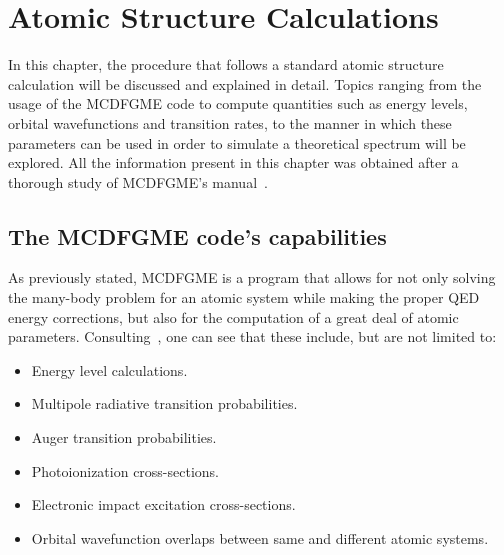
%


\chapter{Atomic Structure Calculations}\label{cha:atom_calc}

In this chapter, the procedure that follows a standard atomic structure calculation will be discussed and explained in detail. Topics ranging from the usage of the \gls{MCDFGME} code to compute  quantities such as energy levels, orbital wavefunctions and transition rates, to the manner in which these parameters can be used in order to simulate a theoretical spectrum will be explored. All the information present in this chapter was obtained after a thorough study of \gls{MCDFGME}'s manual~\cite{Desclaux_Indelicato_2019}.


\section{The \gls{MCDFGME} code's capabilities}
As previously stated, \gls{MCDFGME} is a program that allows for not only solving the many-body problem for an atomic system while making the proper \gls{QED} energy corrections, but also for the computation of a great deal of atomic parameters. Consulting~\cite{mcdfWebsite}, one can see that these include, but are not limited to:

\begin{itemize}
    \item Energy level calculations.
    \item Multipole radiative transition probabilities.
    \item Auger transition probabilities.
    \item Photoionization cross-sections.
    \item Electronic impact excitation cross-sections.
    \item Orbital wavefunction overlaps between same and different atomic systems.
\end{itemize}

